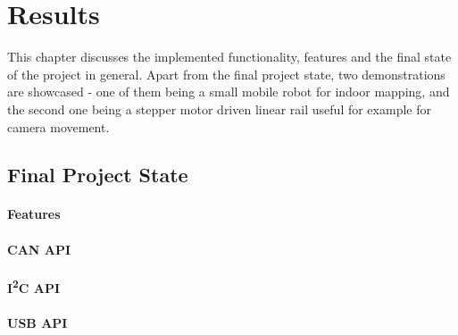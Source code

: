 \chapter{Results}
\label{ch:results}
This chapter discusses the implemented functionality, features and the final state of the project in general.
Apart from the final project state, two demonstrations are showcased - one of them being a small mobile robot for indoor mapping, and the second one being a stepper motor driven linear rail useful for example for camera movement.

\section{Final Project State}
\label{sec:final_project_state}


\subsubsection{Features}

\subsubsection{CAN API}
\subsubsection{I\textsuperscript{2}C API}
\subsubsection{USB API}

